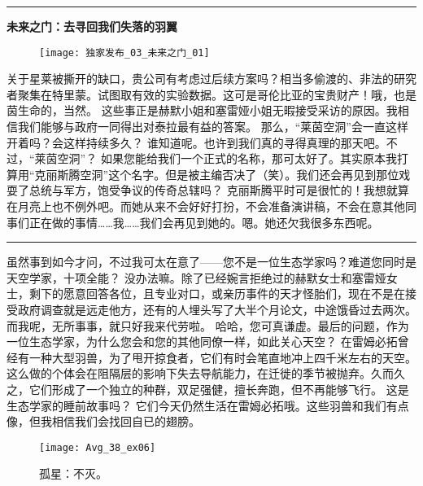 \documentclass[openany]{book}
\begin{document}
\par\noindent\rule{\textwidth}{0.4pt}
\begin{center} \textbf{未来之门：去寻回我们失落的羽翼}\end{center}
\begin{figure}[h]
    \centering
    \texttt{[image: 独家发布\_03\_未来之门\_01]}
\end{figure}
\begin{dialogue}
     关于星莱被撕开的缺口，贵公司有考虑过后续方案吗？相当多偷渡的、非法的研究者聚集在特里蒙。试图取有效的实验数据。这可是哥伦比亚的宝贵财产！哦，也是茵生命的，当然。
     这些事正是赫默小姐和塞雷娅小姐无暇接受采访的原因。我相信我们能够与政府一同得出对泰拉最有益的答案。
     那么，“莱茵空洞”会一直这样开着吗？会这样持续多久？
     谁知道呢。也许到我们真的寻得真理的那天吧。不过，“莱茵空洞”？
     如果您能给我们一个正式的名称，那可太好了。其实原本我打算用“克丽斯腾空洞”这个名字。但是被主编否决了（笑）。我们还会再见到那位戏耍了总统与军方，饱受争议的传奇总辖吗？
     克丽斯腾平时可是很忙的！我想就算在月亮上也不例外吧。而她从来不会好好打扮，不会准备演讲稿，不会在意其他同事们正在做的事情……我……我们会再见到她的。嗯。她还欠我很多东西呢。
    \par\noindent\rule{\textwidth}{0.4pt}
     虽然事到如今才问，不过我可太在意了——您不是一位生态学家吗？难道您同时是天空学家，十项全能？
     没办法嘛。除了已经婉言拒绝过的赫默女士和塞雷娅女士，剩下的愿意回答各位，且专业对口，或亲历事件的天才怪胎们，现在不是在接受政府调查就是远走他方，还有的人埋头写了大半个月论文，中途饿昏过去两次。而我呢，无所事事，就只好我来代劳啦。
     哈哈，您可真谦虚。最后的问题，作为一位生态学家，为什么您会和您的其他同僚一样，如此关心天空？
     在雷姆必拓曾经有一种大型羽兽，为了甩开掠食者，它们有时会笔直地冲上四千米左右的天空。这么做的个体会在阻隔层的影响下失去导航能力，在迁徙的季节被抛弃。久而久之，它们形成了一个独立的种群，双足强健，擅长奔跑，但不再能够飞行。
     这是生态学家的睡前故事吗？
     它们今天仍然生活在雷姆必拓哦。这些羽兽和我们有点像，但我相信我们会找回自已的翅膀。
\end{dialogue}\clearpage

\begin{figure}[h]
    \caption*{孤星：不灭。}
    \centering
    \texttt{[image: Avg\_38\_ex06]}
\end{figure}
\end{document}
